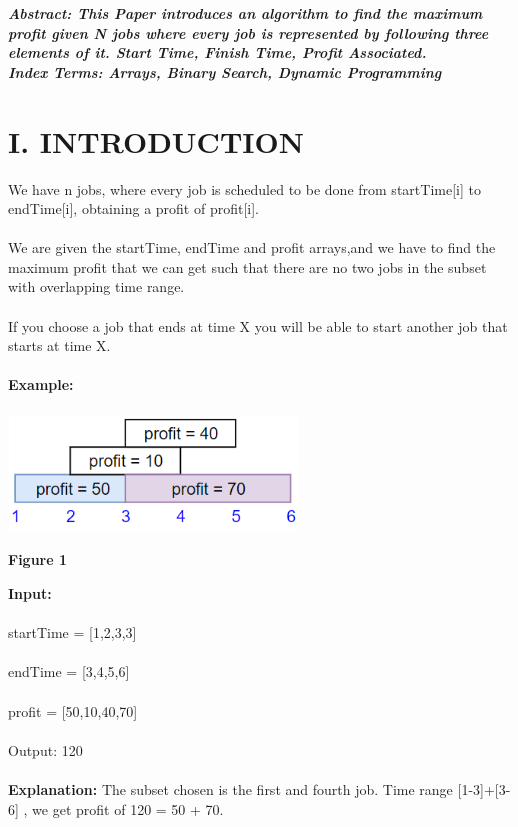 \documentclass[10pt]{article}
\begin{document}
\begin{multicols*}{2}

    \textbf{\emph{{Abstract}: This Paper introduces an algorithm to find the maximum profit given N jobs where every job is represented by following three elements of it. Start Time, Finish Time, Profit Associated.}}\\
	
	\textbf{\emph{{Index Terms}: Arrays, Binary Search, Dynamic Programming\\}}


\section*{I. INTRODUCTION}
 
We have n jobs, where every job is scheduled to be done from startTime[i] to endTime[i], obtaining a profit of profit[i].\\\\We are given the startTime, endTime and profit arrays,and we have to find the maximum profit that we can get such that there are no two jobs in the subset with overlapping time range.\\\\If you choose a job that ends at time X you will be able to start another job that starts at time X.\\\\\textbf{Example:}\\\\

\includegraphics[width=7.7cm, height=3.1cm]{sample1.png}\begin{center}\textbf{Figure 1}\end{center}
\textbf{Input:}\\\\ startTime = [1,2,3,3]\\\\endTime = [3,4,5,6]\\\\profit = [50,10,40,70]\\\\Output: 120\\\\\textbf{Explanation:} The subset chosen is the first and fourth job. 
Time range [1-3]+[3-6] , we get profit of 120 = 50 + 70.


\end{multicols*}
\end{document}
